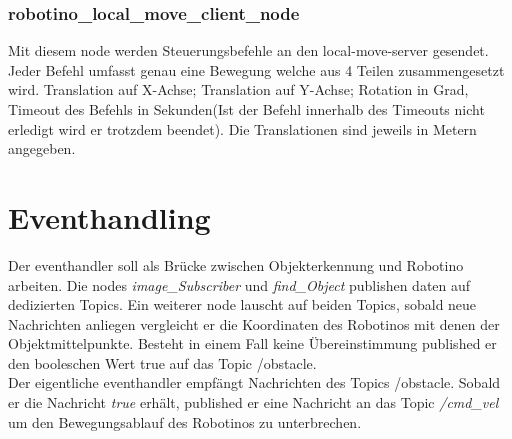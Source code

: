 		\subsubsection{robotino\_local\_move\_client\_node}
		Mit diesem node werden Steuerungsbefehle an den local-move-server gesendet. Jeder Befehl umfasst genau eine Bewegung welche aus 4 Teilen zusammengesetzt wird. Translation auf X-Achse; Translation auf Y-Achse; Rotation in Grad, Timeout des Befehls in Sekunden(Ist der Befehl innerhalb des Timeouts nicht erledigt wird er trotzdem beendet). Die Translationen sind jeweils in Metern angegeben.

	\section{Eventhandling}
	Der eventhandler soll als Brücke zwischen Objekterkennung und Robotino arbeiten. Die nodes \textit{image\_Subscriber} und \textit{find\_Object} publishen daten auf dedizierten Topics. Ein weiterer node lauscht auf beiden Topics, sobald neue Nachrichten anliegen vergleicht er die Koordinaten des Robotinos mit denen der Objektmittelpunkte. Besteht in einem Fall keine Übereinstimmung published er den booleschen Wert true auf das Topic /obstacle.\\
	Der eigentliche eventhandler empfängt Nachrichten des Topics /obstacle. Sobald er die Nachricht \textit{true} erhält, published er eine Nachricht an das Topic \textit{/cmd\_vel} um den Bewegungsablauf des Robotinos zu unterbrechen.
	
	

